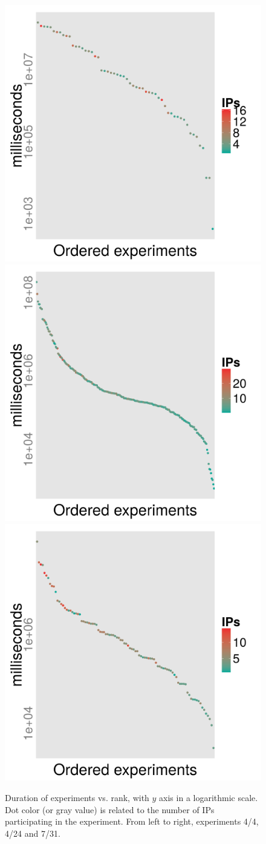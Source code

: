 \documentclass{sig-alternate}
\begin{document}
\begin{figure}[!htb]
\centering
\includegraphics[width=0.32\linewidth]{time-vs-rank-OS-4-4.png}
\includegraphics[width=0.32\linewidth]{time-vs-rank-OS-4-24.png}
\includegraphics[width=0.32\linewidth]{time-vs-rank-OS-7-31.png}
\caption{Duration of experiments vs. rank, with $y$ axis in a
  logarithmic scale. Dot color (or gray value) is related to the number of IPs
  participating in the experiment. From left to right, experiments
  4/4, 4/24 and 7/31.} 
\label{fig:zipf:os}
\end{figure}
%
\end{document}
